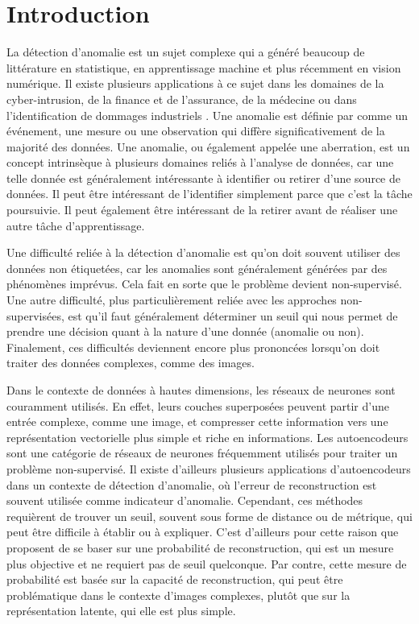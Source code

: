\chapter*{Introduction}         %
\label{chap:introduction}       %


La détection d'anomalie est un sujet complexe qui a généré beaucoup de littérature en statistique,  en apprentissage machine et plus récemment en vision numérique. Il existe plusieurs applications à ce sujet dans les domaines de la cyber-intrusion, de la finance et de l'assurance, de la médecine ou dans l'identification de dommages industriels \citep{Chandola07anomalydetection:}. Une anomalie est définie par \cite{Zimek2017} comme un événement, une mesure ou une observation qui diffère significativement de la majorité des données. Une anomalie, ou également appelée une aberration, est un concept intrinsèque à plusieurs domaines reliés à l'analyse de données, car une telle donnée est généralement intéressante à identifier ou retirer d'une source de données. Il peut être intéressant de l'identifier simplement parce que c'est  la tâche poursuivie. Il peut également être intéressant de la retirer avant de réaliser une autre tâche d'apprentissage. \newline

Une difficulté reliée à la détection d'anomalie est qu'on doit souvent utiliser des données non étiquetées, car les anomalies sont généralement générées par des phénomènes imprévus. Cela fait en sorte que le problème devient non-supervisé. Une autre difficulté, plus particulièrement reliée avec les approches non-supervisées, est qu'il faut généralement déterminer un seuil qui nous permet de prendre une décision quant à la nature d'une donnée (anomalie ou non). Finalement, ces difficultés deviennent encore plus prononcées lorsqu'on doit traiter des données complexes, comme des images. \newline

Dans le contexte de données à hautes dimensions, les réseaux de neurones sont couramment utilisés. En effet, leurs couches superposées peuvent partir d'une entrée complexe, comme une image, et compresser cette information vers une représentation vectorielle plus simple et riche en informations. Les autoencodeurs sont une catégorie de réseaux de neurones fréquemment utilisés pour traiter un problème non-supervisé. Il existe d'ailleurs plusieurs applications d'autoencodeurs dans un contexte de détection d'anomalie, où l'erreur de reconstruction est souvent utilisée comme indicateur d'anomalie. Cependant, ces méthodes requièrent de trouver un seuil, souvent sous forme de distance ou de métrique, qui peut être difficile à établir ou à expliquer. C'est d'ailleurs pour cette raison que  \cite{An2015VariationalAB} proposent de se baser sur une probabilité de reconstruction, qui est un mesure plus objective et ne requiert pas de seuil quelconque. Par contre, cette mesure de probabilité est basée sur la capacité de reconstruction, qui peut être problématique dans le contexte d'images complexes, plutôt que sur la représentation latente, qui elle est plus simple.  \newline

